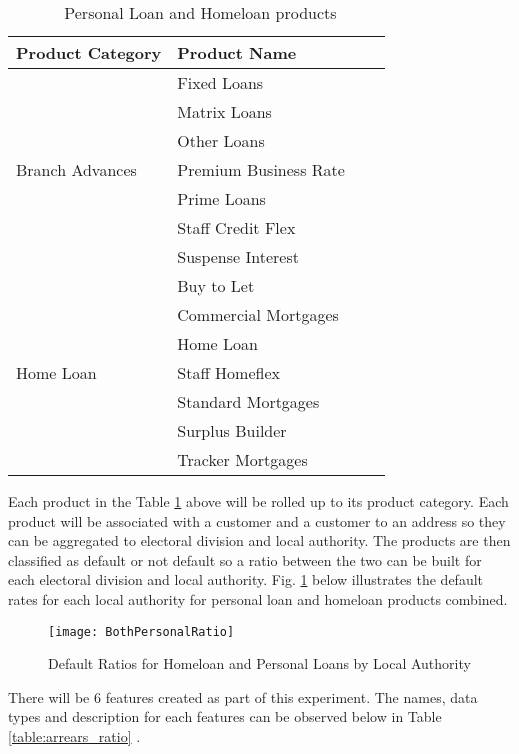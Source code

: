 \begin{table}[H]
	\centering
		\small
			\begin{tabular}{llll}
			\hline
			\textbf{Product Category} & \textbf{Product Name} \\ \hline
			     & Fixed Loans \\ 
			    & Matrix Loans \\ 
			     & Other Loans \\ 
			Branch Advances     & Premium Business Rate \\ 
			     & Prime Loans \\ 
			     & Staff Credit Flex \\ 
					& Suspense Interest \\ \hline
			           & Buy to Let \\ 
			           & Commercial Mortgages \\ 
			           & Home Loan \\ 
			Home Loan           & Staff Homeflex \\ 
			           & Standard Mortgages \\ 
			           & Surplus Builder \\ 	
			           & Tracker Mortgages \\ \hline		
		\end{tabular}
	\caption{\subjectname\ Personal Loan and Homeloan products}
	\label{table:AIB_Products}
\end{table}

Each product in the Table \ref{table:AIB_Products} above will be rolled up to its product category. Each product will be associated with a customer and a customer to an address so they can be aggregated to electoral division and local authority. The products are then classified as default or not default so a ratio between the two can be built for each electoral division and local authority. Fig. \ref{fig:BothPersonalRatio} below illustrates the default rates for each local authority for personal loan and homeloan products combined. 

\begin{figure}[H]
	\texttt{[image: BothPersonalRatio]}
	\caption{Default Ratios for Homeloan and Personal Loans by Local Authority}
	\label{fig:BothPersonalRatio}
\end{figure}

There will be 6 features created as part of this experiment. The names, data types and description for each features can be observed below in Table \ref{table:arrears_ratio} .

